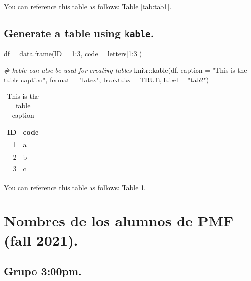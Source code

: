 \documentclass[12pt,halfline,a4paper,]{ouparticle}
\newenvironment{Shaded}{\begin{snugshade}}{\end{snugshade}}
\newcommand{\AttributeTok}[1]{\textcolor[rgb]{0.77,0.63,0.00}{#1}}
\newcommand{\CommentTok}[1]{\textcolor[rgb]{0.56,0.35,0.01}{\textit{#1}}}
\newcommand{\ConstantTok}[1]{\textcolor[rgb]{0.00,0.00,0.00}{#1}}
\newcommand{\DecValTok}[1]{\textcolor[rgb]{0.00,0.00,0.81}{#1}}
\newcommand{\FunctionTok}[1]{\textcolor[rgb]{0.00,0.00,0.00}{#1}}
\newcommand{\NormalTok}[1]{#1}
\newcommand{\OtherTok}[1]{\textcolor[rgb]{0.56,0.35,0.01}{#1}}
\newcommand{\SpecialCharTok}[1]{\textcolor[rgb]{0.00,0.00,0.00}{#1}}
\newcommand{\StringTok}[1]{\textcolor[rgb]{0.31,0.60,0.02}{#1}}
\begin{document}
You can reference this table as follows: Table \ref{tab:tab1}.

\hypertarget{generate-a-table-using-kable.}{%
\subsection{\texorpdfstring{Generate a table using
\texttt{kable}.}{Generate a table using kable.}}\label{generate-a-table-using-kable.}}

\begin{Shaded}
\begin{Highlighting}[]
\NormalTok{df }\OtherTok{=} \FunctionTok{data.frame}\NormalTok{(}\AttributeTok{ID =} \DecValTok{1}\SpecialCharTok{:}\DecValTok{3}\NormalTok{, }\AttributeTok{code =}\NormalTok{ letters[}\DecValTok{1}\SpecialCharTok{:}\DecValTok{3}\NormalTok{])}

\CommentTok{\# kable can alse be used for creating tables}
\NormalTok{knitr}\SpecialCharTok{::}\FunctionTok{kable}\NormalTok{(df, }\AttributeTok{caption =} \StringTok{"This is the table caption"}\NormalTok{, }\AttributeTok{format =} \StringTok{"latex"}\NormalTok{,}
             \AttributeTok{booktabs =} \ConstantTok{TRUE}\NormalTok{, }\AttributeTok{label =} \StringTok{"tab2"}\NormalTok{)}
\end{Highlighting}
\end{Shaded}

\begin{table}

\caption{\label{tab:tab2}This is the table caption}
\centering
\begin{tabular}[t]{rl}
\toprule
ID & code\\
\midrule
1 & a\\
2 & b\\
3 & c\\
\bottomrule
\end{tabular}
\end{table}

You can reference this table as follows: Table \ref{tab:tab2}.

\hypertarget{nombres-de-los-alumnos-de-pmf-fall-2021.}{%
\section{Nombres de los alumnos de PMF (fall
2021).}\label{nombres-de-los-alumnos-de-pmf-fall-2021.}}

\hypertarget{grupo-300pm.}{%
\subsection{Grupo 3:00pm.}\label{grupo-300pm.}}
\end{document}
